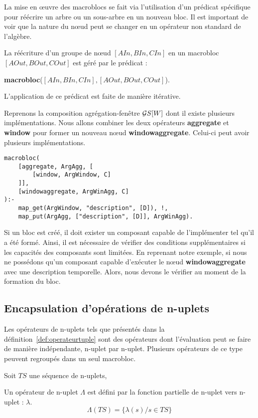 La mise en œuvre des macroblocs se fait via l'utilisation d'un prédicat spécifique pour réécrire un arbre ou un sous-arbre en un nouveau bloc. Il est important de voir que la nature du nœud peut se changer en un opérateur non standard de l'algèbre.
\begin{regle}
La réécriture d'un groupe de nœud $[AIn,BIn,CIn]$ en un macrobloc $[AOut,BOut,COut]$ est géré par le prédicat :
\begin{center} \textbf{macrobloc}($[AIn,BIn,CIn],[AOut,BOut,COut]$).\end{center}
L'application de ce prédicat est faite de manière itérative.
\end{regle}
\begin{example}
    Reprenons la composition agrégation-fenêtre $\mathcal{G} S[W]$ dont il existe plusieurs implémentations. Nous allons combiner les deux opérateurs \textbf{aggregate} et \textbf{window} pour former un nouveau nœud \textbf{windowaggregate}. Celui-ci peut avoir plusieurs implémentations.
    \begin{lstlisting}
macrobloc(
    [aggregate, ArgAgg, [
        [window, ArgWindow, C]
    ]], 
    [windowaggregate, ArgWinAgg, C]
):-
    map_get(ArgWindow, "description", [D]), !,
    map_put(ArgAgg, ["description", [D]], ArgWinAgg). 
    \end{lstlisting}
\end{example}
Si un bloc est créé, il doit exister un composant capable de l'implémenter tel qu'il a été formé. Ainsi, il est nécessaire de vérifier des conditions supplémentaires si les capacités des composants sont limitées. En reprenant notre exemple, si nous ne possédons qu'un composant capable d'exécuter le nœud \textbf{windowaggregate} avec une description temporelle. Alors, nous devons le vérifier au moment de la formation du bloc.

\subsection{Encapsulation d'opérations de n-uplets}
Les opérateurs de n-uplets tels que présentés dans la définition~\ref{def:operateurtuple} sont des opérateurs dont l'évaluation peut se faire de manière indépendante, n-uplet par n-uplet. Plusieurs opérateurs de ce type peuvent regroupés dans un seul macrobloc.
\begin{defi}\label{def:operateurtuple}
    Soit $TS$ une séquence de n-uplets,

    Un opérateur de n-uplet $\Lambda$ est défini par la fonction partielle de n-uplet vers n-uplet : $\lambda$.
    $$\Lambda(TS) = \{\lambda(s) / s \in TS \}$$
\end{defi}


